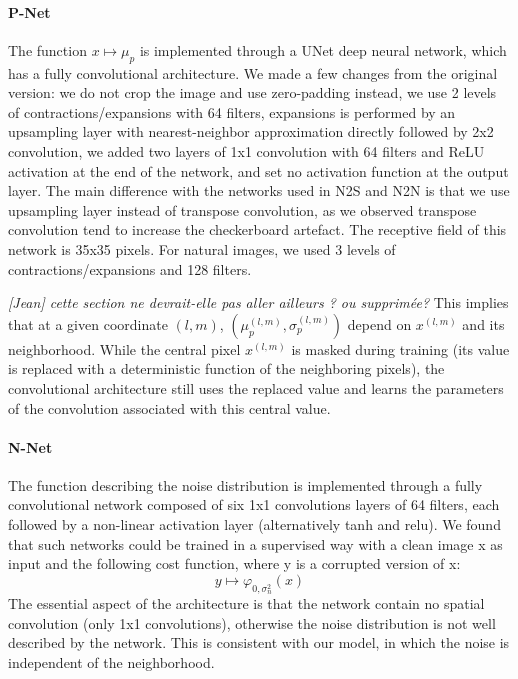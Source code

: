\documentclass{article}
\begin{document}
\paragraph{P-Net}
The function $x\mapsto \mu_p$ is implemented through a UNet \cite{ronneberger2015u} deep neural network, which has a fully convolutional architecture.
We made a few changes from the original version: we do not crop the image and use zero-padding instead, we use 2 levels of contractions/expansions with 64 filters, expansions is performed by an upsampling layer with nearest-neighbor approximation directly followed by 2x2 convolution, we added two layers of 1x1 convolution with 64 filters and ReLU activation at the end of the network, and set no activation function at the output layer.
The main difference with the networks used in N2S and N2N is that we use upsampling layer instead of transpose convolution, as we observed transpose convolution tend to increase the checkerboard artefact.
The receptive field of this network is 35x35 pixels.
For natural images, we used 3 levels of contractions/expansions and 128 filters.

\textit{[Jean] cette section ne devrait-elle pas aller ailleurs ? ou supprimée?}
This implies that at a given coordinate $(l,m)$, $(\mu_p^{(l,m)}, \sigma_p^{(l,m)})$ depend on $x^{(l,m)}$ and its neighborhood.
While the central pixel $x^{(l,m)}$ is masked during training (its value is replaced with a deterministic function of the neighboring pixels), the convolutional architecture still uses the replaced value and learns the parameters of the convolution associated with this central value.

\paragraph{N-Net}
The function describing the noise distribution is implemented through a fully convolutional network composed of six 1x1 convolutions layers of 64 filters, each followed by a non-linear activation layer (alternatively tanh and relu).
We found that such networks could be trained in a supervised way with a clean image x as input and the following cost function, where y is a corrupted version of x:
$$
y\mapsto\varphi_{0,\sigma_n^2}(x)
$$
The essential aspect of the architecture is that the network contain no spatial convolution (only 1x1 convolutions), otherwise the noise distribution is not well described by the network. This is consistent with our model, in which the noise is independent of the neighborhood.
\end{document}
